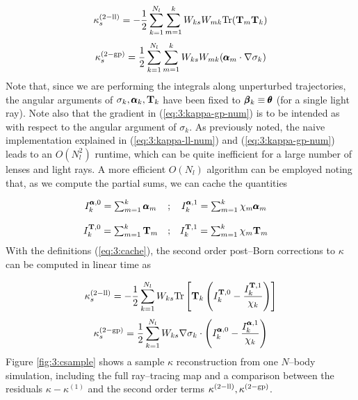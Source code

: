 \begin{equation}
\label{eq:3:kappa-ll-num}
\kappa_s^{(2-{\rm ll})} = -\frac{1}{2}\sum_{k=1}^{N_l}\sum_{m=1}^k W_{ks}W_{mk} {\rm Tr}(\mathbf{T}_m\mathbf{T}_k)
\end{equation}
%
\begin{equation}
\label{eq:3:kappa-gp-num}
\kappa_s^{(2-{\rm gp})} = \frac{1}{2}\sum_{k=1}^{N_l}\sum_{m=1}^k W_{ks}W_{mk} (\pmb{\alpha}_m\cdot\nabla\sigma_k)
\end{equation}
%
Note that, since we are performing the integrals along unperturbed trajectories, the angular arguments of $\sigma_k,\pmb{\alpha}_k,\mathbf{T}_k$ have been fixed to $\pmb{\beta}_k\equiv\pmb{\theta}$ (for a single light ray). Note also that the gradient in (\ref{eq:3:kappa-gp-num}) is to be intended as with respect to the angular argument of $\sigma_k$. As previously noted, the naive implementation explained in (\ref{eq:3:kappa-ll-num}) and (\ref{eq:3:kappa-gp-num}) leads to an $O(N_l^2)$ runtime, which can be quite inefficient for a large number of lenses and light rays. A more efficient $O(N_l)$ algorithm can be employed noting that, as we compute the partial sums, we can cache the quantities 

\begin{equation}
\label{eq:3:cache}
\begin{matrix}
I^{\pmb{\alpha},0}_k = \sum_{m=1}^k \pmb{\alpha}_m & ; & I^{\pmb{\alpha},1}_k = \sum_{m=1}^k \chi_m\pmb{\alpha}_m & \\ \\
I^{\mathbf{T},0}_k = \sum_{m=1}^k \mathbf{T}_m & ; & I^{\mathbf{T},1}_k = \sum_{m=1}^k \chi_m\mathbf{T}_m 
\end{matrix} 
\end{equation} 
%
With the definitions (\ref{eq:3:cache}), the second order post--Born corrections to $\kappa$ can be computed in linear time as  

\begin{equation}
\label{eq:3:kappa-ll-num-lin}
\kappa_s^{(2-{\rm ll})} = -\frac{1}{2}\sum_{k=1}^{N_l} W_{ks} {\rm Tr}\left[\mathbf{T}_k\left(I^{\mathbf{T},0}_k-\frac{I^{\mathbf{T},1}_k}{\chi_k}\right)\right]
\end{equation}
%
\begin{equation}
\label{eq:3:kappa-gp-num-lin}
\kappa_s^{(2-{\rm gp})} = \frac{1}{2}\sum_{k=1}^{N_l} W_{ks}\nabla\sigma_k\cdot\left(I^{\pmb{\alpha},0}_k - \frac{I^{\pmb{\alpha},1}_k}{\chi_k}\right)
\end{equation}
%
Figure \ref{fig:3:csample} shows a sample $\kappa$ reconstruction from one $N$--body simulation, including the full ray--tracing map and a comparison between the residuals $\kappa-\kappa^{(1)}$ and the second order terms $\kappa^{(2-{\rm ll})},\kappa^{(2-{\rm gp})}$. 

